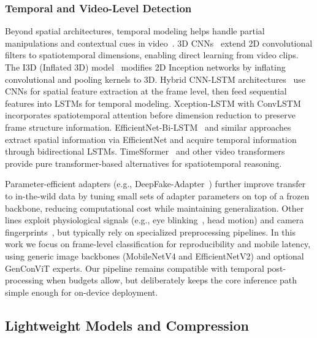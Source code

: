 \subsubsection*{Temporal and Video-Level Detection}
Beyond spatial architectures, temporal modeling helps handle partial manipulations and contextual cues in video~\cite{wilddeepfake2021,undercover2023}. 3D CNNs~\cite{tran2015c3d} extend 2D convolutional filters to spatiotemporal dimensions, enabling direct learning from video clips. The I3D (Inflated 3D) model~\cite{carreira2017i3d} modifies 2D Inception networks by inflating convolutional and pooling kernels to 3D. Hybrid CNN\hyp LSTM architectures~\cite{zhao2022mobilenet_lstm,zhou2023resnext_lstm} use CNNs for spatial feature extraction at the frame level, then feed sequential features into LSTMs for temporal modeling. Xception\hyp LSTM with ConvLSTM~\cite{xception_convlstm2022} incorporates spatiotemporal attention before dimension reduction to preserve frame structure information. EfficientNet\hyp Bi\hyp LSTM~\cite{wang2023efficientnet_bilstm} and similar approaches extract spatial information via EfficientNet and acquire temporal information through bidirectional LSTMs. TimeSformer~\cite{bertasius2021timesformer} and other video transformers provide pure transformer\hyp based alternatives for spatiotemporal reasoning.

Parameter\hyp efficient adapters (e.g., DeepFake\hyp Adapter~\cite{liu2023deepfake_adapter}) further improve transfer to in\hyp the\hyp wild data by tuning small sets of adapter parameters on top of a frozen backbone, reducing computational cost while maintaining generalization. Other lines exploit physiological signals (e.g., eye blinking~\cite{yang2019exposing}, head motion) and camera fingerprints~\cite{cozzolino2019noiseprint}, but typically rely on specialized preprocessing pipelines. In this work we focus on frame\hyp level classification for reproducibility and mobile latency, using generic image backbones (MobileNetV4 and EfficientNetV2) and optional GenConViT experts. Our pipeline remains compatible with temporal post\hyp processing when budgets allow, but deliberately keeps the core inference path simple enough for on\hyp device deployment.

\subsection*{Lightweight Models and Compression}

